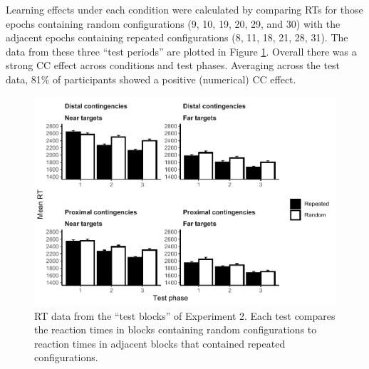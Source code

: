 \documentclass[
  man,floatsintext]{apa7}
\begin{document}
Learning effects under each condition were calculated by comparing RTs for those epochs containing random configurations (9, 10, 19, 20, 29, and 30) with the adjacent epochs containing repeated configurations (8, 11, 18, 21, 28, 31). The data from these three ``test periods'' are plotted in Figure \ref{fig:Exp2-test-figure}. Overall there was a strong CC effect across conditions and test phases. Averaging across the test data, 81\% of participants showed a positive (numerical) CC effect.



\begin{figure}

{\centering \includegraphics[width=1\linewidth]{CCVR_manuscript_files/figure-latex/Exp2-test-figure-1} 

}

\caption{RT data from the ``test blocks'' of Experiment 2. Each test compares the reaction times in blocks containing random configurations to reaction times in adjacent blocks that contained repeated configurations.}\label{fig:Exp2-test-figure}
\end{figure}
\end{document}
